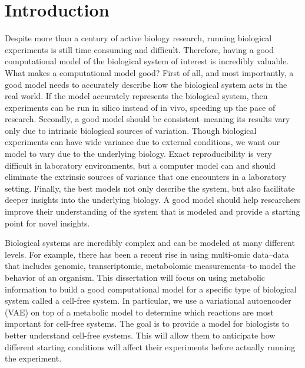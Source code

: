 \chapter{Introduction}
\setcounter{page}{1} 



Despite more than a century of active biology research, running biological experiments is still time consuming and difficult.
Therefore, having a good computational model of the biological system of interest is incredibly valuable.
What makes a computational model good?
First of all, and most importantly, a good model needs to accurately describe how the biological system acts in the real world.
If the model accurately represents the biological system, then experiments can be run in silico instead of in vivo, speeding up the pace of research.
Secondly, a good model should be consistent--meaning its results vary only due to intrinsic biological sources of variation.
Though biological experiments can have wide variance due to external conditions, we want our model to vary due to the underlying biology.
Exact reproducibility is very difficult in laboratory environments, but a computer model can and should eliminate the extrinsic sources of variance that one encounters in a laboratory setting.
Finally, the best models not only describe the system, but also facilitate deeper insights into the underlying biology.
A good model should help researchers improve their understanding of the system that is modeled and provide a starting point for novel insights.

Biological systems are incredibly complex and can be modeled at many different levels.
For example, there has been a recent rise in using multi-omic data--data that includes genomic, transcriptomic, metabolomic measurements--to model the behavior of an organism.
This dissertation will focus on using metabolic information to build a good computational model for a specific type of biological system called a cell-free system.
In particular, we use a variational autoencoder (VAE) on top of a metabolic model to determine which reactions are most important for cell-free systems.
The goal is to provide a model for biologists to better understand cell-free systems.
This will allow them to anticipate how different starting conditions will affect their experiments before actually running the experiment.

